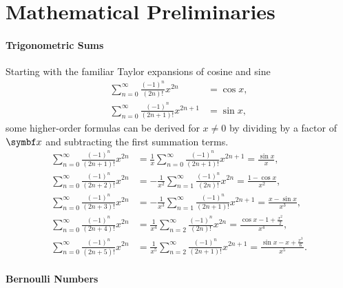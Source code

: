 \section{Mathematical Preliminaries}

\paragraph{Trigonometric Sums}

Starting with the familiar Taylor expansions of cosine and sine
\begin{align}
  \label{eq:cos_sum} \sum_{n=0}^\infty \frac{(-1)^n}{(2n)!} x^{2n}     & = \cos x, \\
  \label{eq:sin_sum} \sum_{n=0}^\infty \frac{(-1)^n}{(2n+1)!} x^{2n+1} & = \sin x,
\end{align}
some higher-order formulas can be derived for $x \neq 0$ by dividing by a factor of $\x$ and subtracting the first summation terms.
\begin{align}
  \label{eq:trig_sum1}
  \sum_{n=0}^\infty \frac{(-1)^n}{(2n+1)!} x^{2n} & = \frac{1}{x} \sum_{n=0}^\infty  \frac{(-1)^n}{(2n+1)!} x^{2n+1} = \frac{\sin x}{x},                        \\
  \label{eq:trig_sum2}
  \sum_{n=0}^\infty \frac{(-1)^n}{(2n+2)!} x^{2n} & = -\frac{1}{x^2} \sum_{n=1}^\infty \frac{(-1)^n}{(2n)!} x^{2n} = \frac{1 - \cos x}{x^2},                    \\
  \label{eq:trig_sum3}
  \sum_{n=0}^\infty \frac{(-1)^n}{(2n+3)!} x^{2n} & = -\frac{1}{x^3} \sum_{n=1}^\infty \frac{(-1)^n}{(2n+1)!} x^{2n+1} = \frac{x - \sin x}{x^3},                \\
  \label{eq:trig_sum4}
  \sum_{n=0}^\infty \frac{(-1)^n}{(2n+4)!} x^{2n} & = \frac{1}{x^4} \sum_{n=2}^\infty \frac{(-1)^n}{(2n)!} x^{2n} = \frac{\cos x - 1 + \frac{x^2}{2}}{x^4},     \\
  \label{eq:trig_sum5}
  \sum_{n=0}^\infty \frac{(-1)^n}{(2n+5)!} x^{2n} & = \frac{1}{x^5} \sum_{n=2}^\infty \frac{(-1)^n}{(2n+1)!} x^{2n+1} = \frac{\sin x - x + \frac{x^3}{6}}{x^5}.
\end{align}

\paragraph{Bernoulli Numbers}

